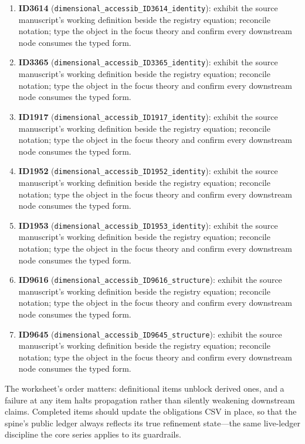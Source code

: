 \documentclass[11pt]{article}
\theoremstyle{remark}
\begin{document}
\begin{enumerate}
\item \textbf{ID3614} (\texttt{dimensional\_accessib\_ID3614\_identity}): exhibit the source manuscript's working definition beside the registry equation; reconcile notation; type the object in the focus theory and confirm every downstream node consumes the typed form.
\item \textbf{ID3365} (\texttt{dimensional\_accessib\_ID3365\_identity}): exhibit the source manuscript's working definition beside the registry equation; reconcile notation; type the object in the focus theory and confirm every downstream node consumes the typed form.
\item \textbf{ID1917} (\texttt{dimensional\_accessib\_ID1917\_identity}): exhibit the source manuscript's working definition beside the registry equation; reconcile notation; type the object in the focus theory and confirm every downstream node consumes the typed form.
\item \textbf{ID1952} (\texttt{dimensional\_accessib\_ID1952\_identity}): exhibit the source manuscript's working definition beside the registry equation; reconcile notation; type the object in the focus theory and confirm every downstream node consumes the typed form.
\item \textbf{ID1953} (\texttt{dimensional\_accessib\_ID1953\_identity}): exhibit the source manuscript's working definition beside the registry equation; reconcile notation; type the object in the focus theory and confirm every downstream node consumes the typed form.
\item \textbf{ID9616} (\texttt{dimensional\_accessib\_ID9616\_structure}): exhibit the source manuscript's working definition beside the registry equation; reconcile notation; type the object in the focus theory and confirm every downstream node consumes the typed form.
\item \textbf{ID9645} (\texttt{dimensional\_accessib\_ID9645\_structure}): exhibit the source manuscript's working definition beside the registry equation; reconcile notation; type the object in the focus theory and confirm every downstream node consumes the typed form.
\end{enumerate}

The worksheet's order matters: definitional items unblock derived ones, and a failure at any item halts propagation rather than silently weakening downstream claims. Completed items should update the obligations CSV in place, so that the spine's public ledger always reflects its true refinement state---the same live-ledger discipline the core series applies to its guardrails.
\end{document}
